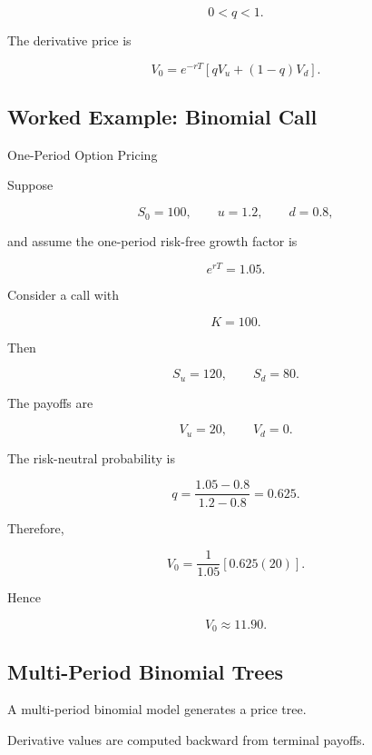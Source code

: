 \[
0<q<1.
\]

The derivative price is

\[
\boxed{
V_0
=
e^{-rT}
\left[
qV_u+(1-q)V_d
\right].
}
\]

\subsection{Worked Example: Binomial Call}
\label{subsec:worked-binomial-call}

\begin{workedexamplebox}{One-Period Option Pricing}

Suppose

\[
S_0=100,
\qquad
u=1.2,
\qquad
d=0.8,
\]

and assume the one-period risk-free growth factor is

\[
e^{rT}=1.05.
\]

Consider a call with

\[
K=100.
\]

Then

\[
S_u=120,
\qquad
S_d=80.
\]

The payoffs are

\[
V_u=20,
\qquad
V_d=0.
\]

The risk-neutral probability is

\[
q
=
\frac{1.05-0.8}{1.2-0.8}
=
0.625.
\]

Therefore,

\[
V_0
=
\frac{1}{1.05}
\left[
0.625(20)
\right].
\]

Hence

\begin{answerbox}
\[
\boxed{
V_0\approx11.90.
}
\]
\end{answerbox}

\end{workedexamplebox}

\subsection{Multi-Period Binomial Trees}
\label{subsec:multi-period-binomial-trees}

A multi-period binomial model generates a price tree.

Derivative values are computed backward from terminal payoffs.

